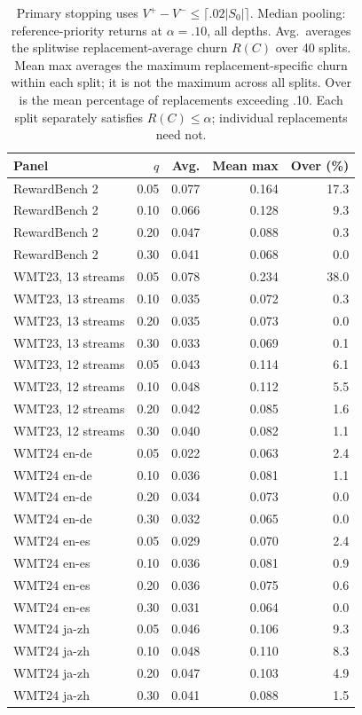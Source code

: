 \begin{table}[t]
\centering\small
\begin{tabular}{lrrrr}
\toprule
Panel & $q$ & Avg. & Mean max & Over (\%) \\
\midrule
RewardBench 2 & 0.05 & 0.077 & 0.164 & 17.3 \\
RewardBench 2 & 0.10 & 0.066 & 0.128 & 9.3 \\
RewardBench 2 & 0.20 & 0.047 & 0.088 & 0.3 \\
RewardBench 2 & 0.30 & 0.041 & 0.068 & 0.0 \\
WMT23, 13 streams & 0.05 & 0.078 & 0.234 & 38.0 \\
WMT23, 13 streams & 0.10 & 0.035 & 0.072 & 0.3 \\
WMT23, 13 streams & 0.20 & 0.035 & 0.073 & 0.0 \\
WMT23, 13 streams & 0.30 & 0.033 & 0.069 & 0.1 \\
WMT23, 12 streams & 0.05 & 0.043 & 0.114 & 6.1 \\
WMT23, 12 streams & 0.10 & 0.048 & 0.112 & 5.5 \\
WMT23, 12 streams & 0.20 & 0.042 & 0.085 & 1.6 \\
WMT23, 12 streams & 0.30 & 0.040 & 0.082 & 1.1 \\
WMT24 en-de & 0.05 & 0.022 & 0.063 & 2.4 \\
WMT24 en-de & 0.10 & 0.036 & 0.081 & 1.1 \\
WMT24 en-de & 0.20 & 0.034 & 0.073 & 0.0 \\
WMT24 en-de & 0.30 & 0.032 & 0.065 & 0.0 \\
WMT24 en-es & 0.05 & 0.029 & 0.070 & 2.4 \\
WMT24 en-es & 0.10 & 0.036 & 0.081 & 0.9 \\
WMT24 en-es & 0.20 & 0.036 & 0.075 & 0.6 \\
WMT24 en-es & 0.30 & 0.031 & 0.064 & 0.0 \\
WMT24 ja-zh & 0.05 & 0.046 & 0.106 & 9.3 \\
WMT24 ja-zh & 0.10 & 0.048 & 0.110 & 8.3 \\
WMT24 ja-zh & 0.20 & 0.047 & 0.103 & 4.9 \\
WMT24 ja-zh & 0.30 & 0.041 & 0.088 & 1.5 \\
\bottomrule
\end{tabular}
\caption{Primary stopping uses $V^+-V^-\le\lceil.02|S_0|\rceil$. Median pooling: reference-priority returns at $\alpha=.10$, all depths. Avg.\ averages the splitwise replacement-average churn $R(C)$ over 40 splits. Mean max averages the maximum replacement-specific churn within each split; it is not the maximum across all splits. Over is the mean percentage of replacements exceeding .10. Each split separately satisfies $R(C)\le\alpha$; individual replacements need not.}
\label{tab:review-replacement-median}
\end{table}
